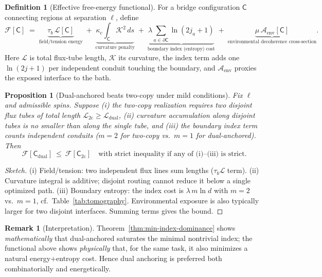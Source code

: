 \documentclass[11pt]{article}
\theoremstyle{plain}
\newtheorem{proposition}[theorem]{Proposition}
\theoremstyle{definition}
\newtheorem{definition}[theorem]{Definition}
\newtheorem{remark}[theorem]{Remark}
\begin{document}
\begin{definition}[Effective free-energy functional]
  For a bridge configuration $\mathsf{C}$ connecting regions at separation $\ell$, define
  \[
    \mathcal{F}[\mathsf{C}]
    \;=\;
    \underbrace{\tau_b\,\mathcal{L}[\mathsf{C}]}_{\text{field/tension energy}}
    \;+\;
    \underbrace{\kappa_c \!\int_{\mathsf{C}} \! \mathcal{K}^2\,ds}_{\text{curvature penalty}}
    \;+\;
    \underbrace{\lambda \sum_{a\in\partial\mathsf{C}} \ln(2j_a+1)}_{\text{boundary index (entropy) cost}}
    \;+\;
    \underbrace{\mu\,\mathcal{A}_{\mathrm{env}}[\mathsf{C}]}_{\text{environmental decoherence cross-section}}.
  \]
  Here $\mathcal{L}$ is total flux-tube length, $\mathcal{K}$ its curvature, the index term adds one $\ln(2j+1)$ per independent conduit touching the boundary, and $\mathcal{A}_{\mathrm{env}}$ proxies the exposed interface to the bath.
\end{definition}

\begin{proposition}[Dual-anchored beats two-copy under mild conditions]
  Fix $\ell$ and admissible spins. Suppose (i) the two-copy realization requires two disjoint flux tubes of total length $\mathcal{L}_{2\mathrm{c}}\ge \mathcal{L}_{\mathrm{dual}}$, (ii) curvature accumulation along disjoint tubes is no smaller than along the single tube, and (iii) the boundary index term counts independent conduits ($m=2$ for two-copy vs.\ $m=1$ for dual-anchored). Then
  \[
    \mathcal{F}[\mathsf{C}_{\mathrm{dual}}]\ \le\ \mathcal{F}[\mathsf{C}_{2\mathrm{c}}]
    \quad\text{with strict inequality if any of (i)--(iii) is strict.}
  \]
\end{proposition}

\begin{proof}[Sketch]
  (i) Field/tension: two independent flux lines sum lengths ($\tau_b \mathcal{L}$ term). (ii) Curvature integral is additive; disjoint routing cannot reduce it below a single optimized path. (iii) Boundary entropy: the index cost is $\lambda\, m\ln d$ with $m=2$ vs.\ $m=1$, cf.\ Table~\ref{tab:tomography}. Environmental exposure is also typically larger for two disjoint interfaces. Summing terms gives the bound.
\end{proof}

\begin{remark}[Interpretation]
  Theorem~\ref{thm:min-index-dominance} shows \emph{mathematically} that dual-anchored saturates the minimal nontrivial index; the functional above shows \emph{physically} that, for the same task, it also minimizes a natural energy+entropy cost. Hence dual anchoring is preferred both combinatorially and energetically.
\end{remark}
\end{document}
